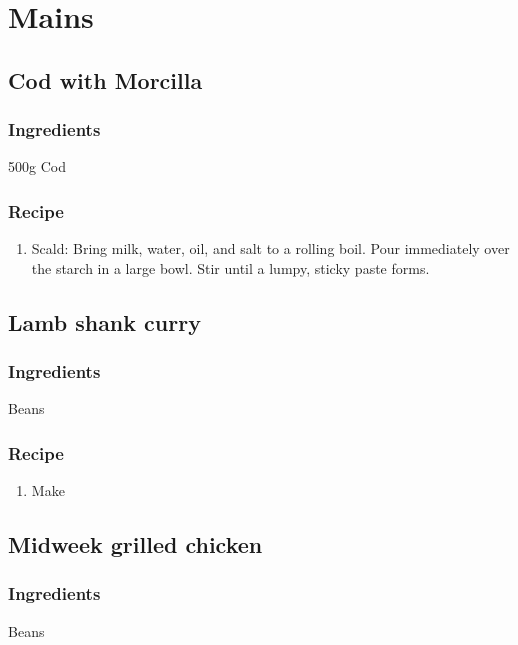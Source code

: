 \newpage
\clearpage
\chapter{Mains}
\section{Cod with Morcilla}
\subsection*{Ingredients}
\begin{ingredients}
    \item 500g Cod
\end{ingredients}
\subsection*{Recipe}
\begin{enumerate}
    \item Scald: Bring milk, water, oil, and salt to a rolling boil. Pour immediately over the starch in a large bowl. Stir until a lumpy, sticky paste forms.
\end{enumerate}

\newpage
\section{Lamb shank curry}
\subsection*{Ingredients}
\begin{ingredients}
    \item Beans
\end{ingredients}
\subsection*{Recipe}
\begin{enumerate}
    \item Make
\end{enumerate}

\newpage
\section{Midweek grilled chicken}
\subsection*{Ingredients}
\begin{ingredients}
    \item Beans
\end{ingredients}

